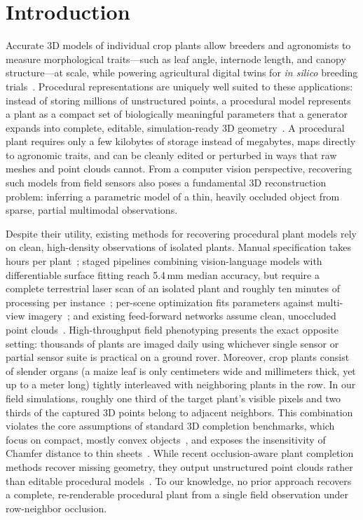 \documentclass[10pt,twocolumn,letterpaper]{article}
\begin{document}
\section{Introduction}
\label{sec:intro}

Accurate 3D models of individual crop plants allow breeders and agronomists to measure morphological traits---such as leaf angle, internode length, and canopy structure---at scale, while powering agricultural digital twins for \emph{in silico} breeding trials~\citep{hadadi2025procmaize, maizefield3d2025}. Procedural representations are uniquely well suited to these applications: instead of storing millions of unstructured points, a procedural model represents a plant as a compact set of biologically meaningful parameters that a generator expands into complete, editable, simulation-ready 3D geometry~\citep{prusin1990abop, floraforge2026}. A procedural plant requires only a few kilobytes of storage instead of megabytes, maps directly to agronomic traits, and can be cleanly edited or perturbed in ways that raw meshes and point clouds cannot. From a computer vision perspective, recovering such models from field sensors also poses a fundamental 3D reconstruction problem: inferring a parametric model of a thin, heavily occluded object from sparse, partial multimodal observations.

Despite their utility, existing methods for recovering procedural plant models rely on clean, high-density observations of isolated plants. Manual specification takes hours per plant~\citep{floraforge2026}; staged pipelines combining vision-language models with differentiable surface fitting reach 5.4\,mm median accuracy, but require a complete terrestrial laser scan of an isolated plant and roughly ten minutes of processing per instance~\citep{hadadi2026vlmmaize}; per-scene optimization fits parameters against multi-view imagery~\citep{cropcraft2026}; and existing feed-forward networks assume clean, unoccluded point clouds~\citep{demeter2025, ghrer2025paramplants}. High-throughput field phenotyping presents the exact opposite setting: thousands of plants are imaged daily using whichever single sensor or partial sensor suite is practical on a ground rover. Moreover, crop plants consist of slender organs (a maize leaf is only centimeters wide and millimeters thick, yet up to a meter long) tightly interleaved with neighboring plants in the row. In our field simulations, roughly one third of the target plant's visible pixels and two thirds of the captured 3D points belong to adjacent neighbors. This combination violates the core assumptions of standard 3D completion benchmarks, which focus on compact, mostly convex objects~\citep{yuan2018pcn,yu2021pointr}, and exposes the insensitivity of Chamfer distance to thin sheets~\citep{wu2021dcd, song2026structural}. While recent occlusion-aware plant completion methods recover missing geometry, they output unstructured point clouds rather than editable procedural models~\citep{lee2026occ}. To our knowledge, no prior approach recovers a complete, re-renderable procedural plant from a single field observation under row-neighbor occlusion.
\end{document}
